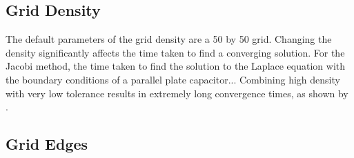 \subsection{Grid Density}
\label{subsec:grid_density}

The default parameters of the grid density are a 50 by 50 grid. Changing the density significantly affects the time taken to find a converging solution. For the Jacobi method, the time taken to find the solution to the Laplace equation with the boundary conditions of a parallel plate capacitor... Combining high density with very low tolerance results in extremely long convergence times, as shown by .

\subsection{Grid Edges}
\label{subsec:grid_edges}

